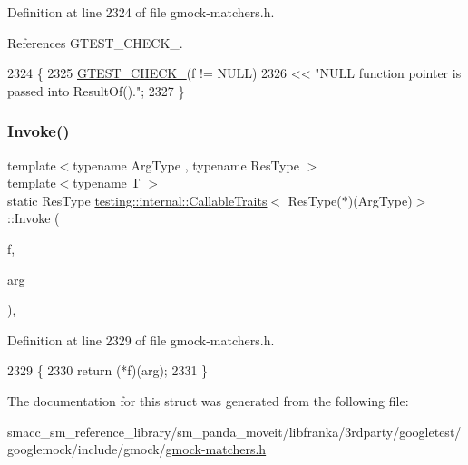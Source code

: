 Definition at line 2324 of file gmock-\/matchers.\+h.



References G\+T\+E\+S\+T\+\_\+\+C\+H\+E\+C\+K\+\_\+.


\begin{DoxyCode}
2324                                                  \{
2325     \hyperlink{gtest-port_8h_ab54343f0a36dc4cb0ce8a478dd7847b8}{GTEST\_CHECK\_}(f != NULL)
2326         << \textcolor{stringliteral}{"NULL function pointer is passed into ResultOf()."};
2327   \}
\end{DoxyCode}
\mbox{\label{structtesting_1_1internal_1_1CallableTraits_3_01ResType_07_5_08_07ArgType_08_4_a8a61fc15cde62a0f06b2ee5a0a805c6c}} 
\subsubsection{\texorpdfstring{Invoke()}{Invoke()}}
{\footnotesize\ttfamily template$<$typename Arg\+Type , typename Res\+Type $>$ \\
template$<$typename T $>$ \\
static Res\+Type \hyperlink{structtesting_1_1internal_1_1CallableTraits}{testing\+::internal\+::\+Callable\+Traits}$<$ Res\+Type($\ast$)(Arg\+Type)$>$\+::Invoke (\begin{DoxyParamCaption}\item[{Res\+Type($\ast$)(Arg\+Type)}]{f,  }\item[{T}]{arg }\end{DoxyParamCaption})\hspace{0.3cm}{\ttfamily [inline]}, {\ttfamily [static]}}



Definition at line 2329 of file gmock-\/matchers.\+h.


\begin{DoxyCode}
2329                                                      \{
2330     \textcolor{keywordflow}{return} (*f)(arg);
2331   \}
\end{DoxyCode}


The documentation for this struct was generated from the following file\+:\begin{DoxyCompactItemize}
\item 
smacc\+\_\+sm\+\_\+reference\+\_\+library/sm\+\_\+panda\+\_\+moveit/libfranka/3rdparty/googletest/googlemock/include/gmock/\hyperlink{gmock-matchers_8h}{gmock-\/matchers.\+h}\end{DoxyCompactItemize}
